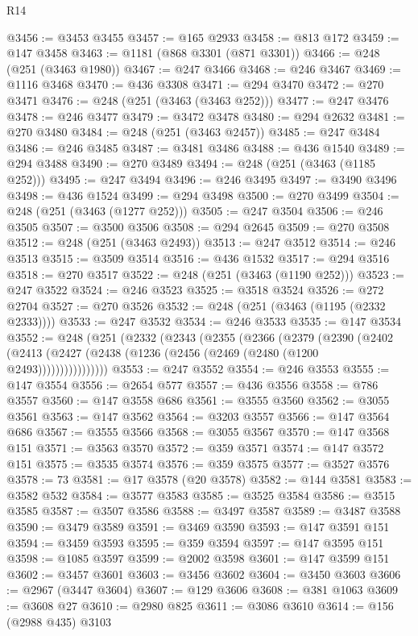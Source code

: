 \begin{lexlean}{R14}
\begin{coremodule}
@3456 := @3453 @3455
@3457 := @165 @2933
@3458 := @813 @172
@3459 := @147 @3458
@3463 := @1181 (@868 @3301 (@871 @3301))
@3466 := @248 (@251 (@3463 @1980))
@3467 := @247 @3466
@3468 := @246 @3467
@3469 := @1116 @3468
@3470 := @436 @3308
@3471 := @294 @3470
@3472 := @270 @3471
@3476 := @248 (@251 (@3463 (@3463 @252)))
@3477 := @247 @3476
@3478 := @246 @3477
@3479 := @3472 @3478
@3480 := @294 @2632
@3481 := @270 @3480
@3484 := @248 (@251 (@3463 @2457))
@3485 := @247 @3484
@3486 := @246 @3485
@3487 := @3481 @3486
@3488 := @436 @1540
@3489 := @294 @3488
@3490 := @270 @3489
@3494 := @248 (@251 (@3463 (@1185 @252)))
@3495 := @247 @3494
@3496 := @246 @3495
@3497 := @3490 @3496
@3498 := @436 @1524
@3499 := @294 @3498
@3500 := @270 @3499
@3504 := @248 (@251 (@3463 (@1277 @252)))
@3505 := @247 @3504
@3506 := @246 @3505
@3507 := @3500 @3506
@3508 := @294 @2645
@3509 := @270 @3508
@3512 := @248 (@251 (@3463 @2493))
@3513 := @247 @3512
@3514 := @246 @3513
@3515 := @3509 @3514
@3516 := @436 @1532
@3517 := @294 @3516
@3518 := @270 @3517
@3522 := @248 (@251 (@3463 (@1190 @252)))
@3523 := @247 @3522
@3524 := @246 @3523
@3525 := @3518 @3524
@3526 := @272 @2704
@3527 := @270 @3526
@3532 := @248 (@251 (@3463 (@1195 (@2332 @2333))))
@3533 := @247 @3532
@3534 := @246 @3533
@3535 := @147 @3534
@3552 := @248
    (@251
      (@2332
        (@2343
          (@2355
            (@2366
              (@2379
                (@2390
                  (@2402
                    (@2413 (@2427 (@2438 (@1236 (@2456 (@2469 (@2480 (@1200 @2493))))))))))))))))
@3553 := @247 @3552
@3554 := @246 @3553
@3555 := @147 @3554
@3556 := @2654 @577
@3557 := @436 @3556
@3558 := @786 @3557
@3560 := @147 @3558 @686
@3561 := @3555 @3560
@3562 := @3055 @3561
@3563 := @147 @3562
@3564 := @3203 @3557
@3566 := @147 @3564 @686
@3567 := @3555 @3566
@3568 := @3055 @3567
@3570 := @147 @3568 @151
@3571 := @3563 @3570
@3572 := @359 @3571
@3574 := @147 @3572 @151
@3575 := @3535 @3574
@3576 := @359 @3575
@3577 := @3527 @3576
@3578 := 73
@3581 := @17 @3578 (@20 @3578)
@3582 := @144 @3581
@3583 := @3582 @532
@3584 := @3577 @3583
@3585 := @3525 @3584
@3586 := @3515 @3585
@3587 := @3507 @3586
@3588 := @3497 @3587
@3589 := @3487 @3588
@3590 := @3479 @3589
@3591 := @3469 @3590
@3593 := @147 @3591 @151
@3594 := @3459 @3593
@3595 := @359 @3594
@3597 := @147 @3595 @151
@3598 := @1085 @3597
@3599 := @2002 @3598
@3601 := @147 @3599 @151
@3602 := @3457 @3601
@3603 := @3456 @3602
@3604 := @3450 @3603
@3606 := @2967 (@3447 @3604)
@3607 := @129 @3606
@3608 := @381 @1063
@3609 := @3608 @27
@3610 := @2980 @825
@3611 := @3086 @3610
@3614 := @156 (@2988 @435) @3103

\end{coremodule}
\end{lexlean}
